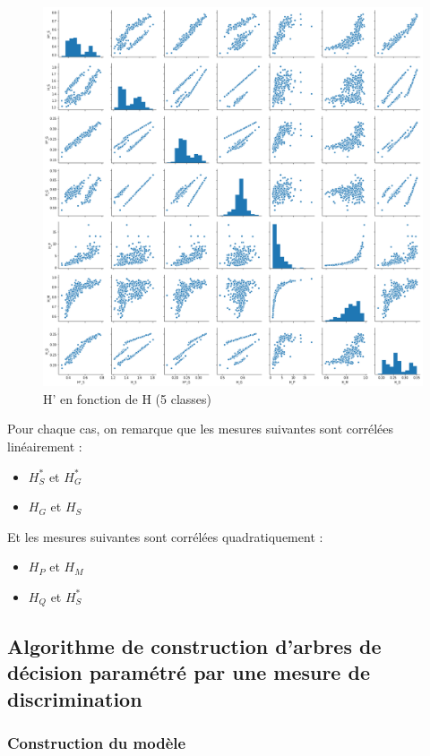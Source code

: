 \documentclass[a4paper]{article}
\begin{document}
\begin{figure}[H]
	\center 
	\includegraphics[width=1\textwidth]{images/H_5.png}
    \caption{H' en fonction de H (5 classes)}
    \label{img:H_5}
\end{figure}

Pour chaque cas, on remarque que les mesures suivantes sont corrélées
linéairement :
\begin{itemize}
    \item $H^*_S$ et $H^*_G$
    \item $H_G$ et $H_S$
\end{itemize}

Et les mesures suivantes sont corrélées quadratiquement :
\begin{itemize}
    \item $H_P$ et $H_M$
    \item $H_Q$ et $H^*_S$
\end{itemize}

\subsection{Algorithme de construction d'arbres de décision paramétré par une
mesure de discrimination}

\subsubsection{Construction du modèle}
\end{document}
